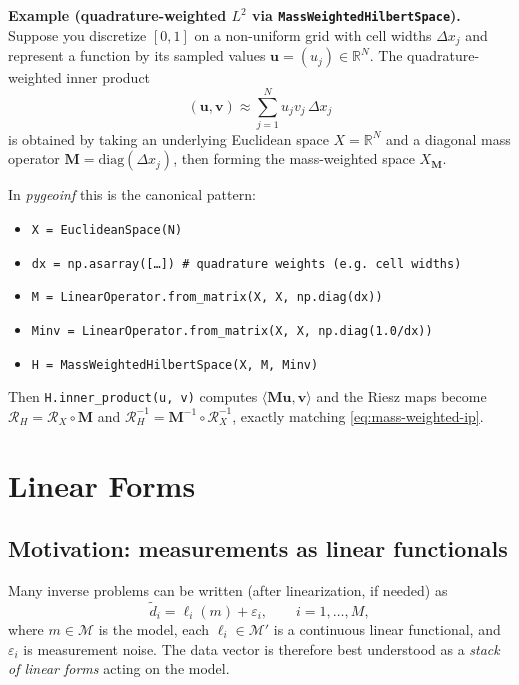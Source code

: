 \documentclass[11pt,twoside,openright]{book}
\theoremstyle{plain}
\theoremstyle{definition}
\theoremstyle{remark}
\newcommand{\modelspace}{\mathcal{M}}
\newcommand{\Riesz}{\mathcal{R}}
\begin{document}
\begin{examplebox}
\textbf{Example (quadrature-weighted $L^2$ via \texttt{MassWeightedHilbertSpace}).}
Suppose you discretize $[0,1]$ on a non-uniform grid with cell widths
$\Delta x_j$ and represent a function by its sampled values
$\mathbf{u}=(u_j)\in\mathbb{R}^N$.
The quadrature-weighted inner product
\[
(\mathbf{u},\mathbf{v}) \approx \sum_{j=1}^N u_j v_j\,\Delta x_j
\]
is obtained by taking an underlying Euclidean space $X=\mathbb{R}^N$ and a diagonal
mass operator $\mathbf{M}=\mathrm{diag}(\Delta x_j)$, then forming the mass-weighted space
$X_{\mathbf{M}}$.

In \textit{pygeoinf} this is the canonical pattern:
\begin{itemize}
  \item \texttt{X = EuclideanSpace(N)}
  \item \texttt{dx = np.asarray([\ldots])  \# quadrature weights (e.g. cell widths)}
  \item \texttt{M = LinearOperator.from\_matrix(X, X, np.diag(dx))}
  \item \texttt{Minv = LinearOperator.from\_matrix(X, X, np.diag(1.0/dx))}
  \item \texttt{H = MassWeightedHilbertSpace(X, M, Minv)}
\end{itemize}
Then \texttt{H.inner\_product(u, v)} computes $\langle \mathbf{M}\mathbf{u},\mathbf{v}\rangle$
and the Riesz maps become $\Riesz_H = \Riesz_X\circ\mathbf{M}$ and
$\Riesz_H^{-1}=\mathbf{M}^{-1}\circ\Riesz_X^{-1}$, exactly matching
\eqref{eq:mass-weighted-ip}.
\end{examplebox}



\chapter{Linear Forms}
\label{ch:linear-forms}

\section{Motivation: measurements as linear functionals}
\label{sec:forms-motivation}

Many inverse problems can be written (after linearization, if needed) as
\[
  \tilde{d}_i = \ell_i(m) + \varepsilon_i, \qquad i=1,\ldots,M,
\]
where $m\in\modelspace$ is the model, each $\ell_i\in\modelspace'$ is a
continuous linear functional, and $\varepsilon_i$ is measurement noise.
The data vector is therefore best understood as a \emph{stack of linear forms}
acting on the model.
\end{document}
